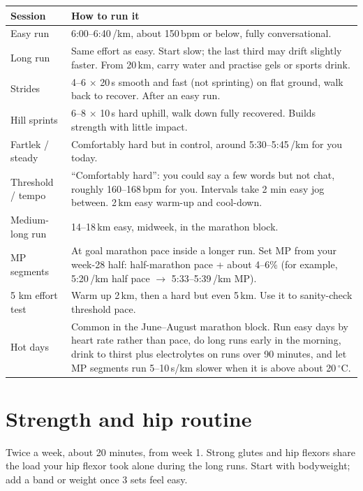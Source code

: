 \documentclass[11pt,a4paper]{article}
\begin{document}
\begin{center}
\begin{tabular}{@{}L{3.2cm}L{12.0cm}@{}}
\toprule
\textbf{Session} & \textbf{How to run it} \\
\midrule
Easy run & 6:00--6:40\,/km, about 150\,bpm or below, fully conversational. \\
Long run & Same effort as easy. Start slow; the last third may drift slightly faster. From 20\,km, carry water and practise gels or sports drink. \\
Strides & 4--6 $\times$ 20\,s smooth and fast (not sprinting) on flat ground, walk back to recover. After an easy run. \\
Hill sprints & 6--8 $\times$ 10\,s hard uphill, walk down fully recovered. Builds strength with little impact. \\
Fartlek / steady & Comfortably hard but in control, around 5:30--5:45\,/km for you today. \\
Threshold / tempo & ``Comfortably hard'': you could say a few words but not chat, roughly 160--168\,bpm for you. Intervals take 2 min easy jog between. 2\,km easy warm-up and cool-down. \\
Medium-long run & 14--18\,km easy, midweek, in the marathon block. \\
MP segments & At goal marathon pace inside a longer run. Set MP from your week-28 half: half-marathon pace + about 4--6\% (for example, 5:20\,/km half pace $\rightarrow$ 5:33--5:39\,/km MP). \\
5 km effort test & Warm up 2\,km, then a hard but even 5\,km. Use it to sanity-check threshold pace. \\
Hot days & Common in the June--August marathon block. Run easy days by heart rate rather than pace, do long runs early in the morning, drink to thirst plus electrolytes on runs over 90 minutes, and let MP segments run 5--10\,s/km slower when it is above about 20\,$^{\circ}$C. \\
\bottomrule
\end{tabular}
\end{center}

\section*{Strength and hip routine}

Twice a week, about 20 minutes, from week 1. Strong glutes and hip flexors share the load your hip flexor took alone during the long runs. Start with bodyweight; add a band or weight once 3 sets feel easy.
\end{document}
